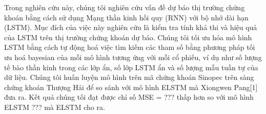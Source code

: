 Trong nghiên cứu này, chúng tôi nghiên cứu vấn đề dự báo thị trường chứng khoán bằng cách sử dụng
Mạng thần kinh hồi quy (RNN) với bộ nhớ dài hạn (LSTM). Mục đích của việc này
nghiên cứu là kiểm tra tính khả thi và hiệu quả của LSTM trên thị trường chứng khoán
dự báo. Chúng tôi tối ưu hóa mô hình LSTM bằng cách tự động hoá việc tìm kiếm các tham số bằng phương pháp tối ưu hoá bayesian của mỗi mô hình tương ứng với mỗi cổ phiếu, ví dụ như số lượng tế bào thần kinh trong các lớp ẩn, số lớp LSTM ẩn và số lượng mẫu tuần tự của dữ liệu. Chúng tôi huấn luyện mô hình trên mã chứng khoán Sinopec trên sàng chứng khoán Thượng Hải để so sánh với mô hình ELSTM mà Xiongwen Pang[1] đưa ra. Kết quả chúng tối đạt được chỉ số MSE = ??? thấp hơn so với mô hình ELSTM ??? mà ELSTM cho ra. 